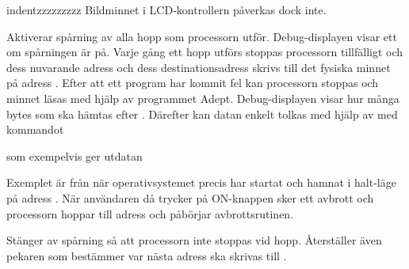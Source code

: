 \documentclass[main.tex]{subfiles}
\begin{document}
\begin{labeling}{indentzzzzzzzzz}
    Bildminnet i LCD-kontrollern påverkas dock inte.
\item[\mono{trace\_enable}]
    Aktiverar spårning av alla hopp som processorn utför. Debug-displayen visar
    ett  om spårningen är på. Varje gång ett hopp utförs stoppas
    processorn tillfälligt och dess nuvarande adress och dess
    destinationsadress skrivs till det fysiska minnet på adress .
    Efter att ett program har kommit fel kan processorn stoppas och minnet
    läsas med hjälp av programmet Adept. Debug-displayen visar hur många bytes
    som ska hämtas efter . Därefter kan datan enkelt tolkas med
    hjälp av  med kommandot
    
    som exempelvis ger utdatan
    
    Exemplet är från när operativsystemet precis har startat och hamnat i
    halt-läge på adress . När användaren då trycker på ON-knappen
    sker ett avbrott och processorn hoppar till adress  och
    påbörjar avbrottsrutinen.
\item[\mono{trace\_disable}]
    Stänger av spårning så att processorn inte stoppas vid hopp. Återställer
    även pekaren som bestämmer var nästa adress ska skrivas till
    .
\end{labeling}

\clearpage
\end{document}
